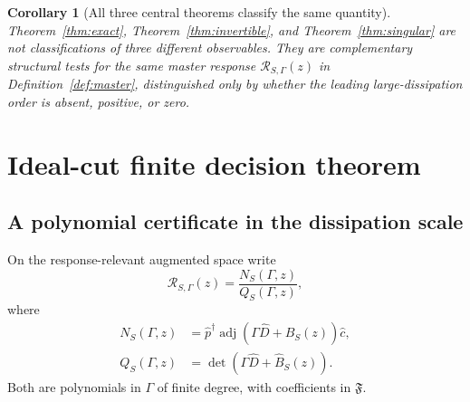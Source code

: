 \documentclass[11pt]{article}
\newtheorem{corollary}[theorem]{Corollary}
\theoremstyle{definition}
\theoremstyle{remark}
\theoremstyle{plain}
\newcommand{\R}{\mathcal R}
\newcommand{\adj}{\operatorname{adj}}
\begin{document}
\begin{corollary}[All three central theorems classify the same quantity]
Theorem~\ref{thm:exact}, Theorem~\ref{thm:invertible}, and Theorem~\ref{thm:singular} are not classifications of three different observables.  They are complementary structural tests for the same master response $\R_{S,\Gamma}(z)$ in Definition~\ref{def:master}, distinguished only by whether the leading large-dissipation order is absent, positive, or zero.
\end{corollary}

\section{Ideal-cut finite decision theorem}

\subsection{A polynomial certificate in the dissipation scale}
On the response-relevant augmented space write
\begin{equation}
 \R_{S,\Gamma}(z)
 =\frac{N_S(\Gamma,z)}{Q_S(\Gamma,z)},
\end{equation}
where
\begin{align}
 N_S(\Gamma,z)
 &=\widehat p^\dagger\adj\!\left(\Gamma\widehat D+
 \widehat B_S(z)\right)\widehat c,\label{eq:numerator}\\
 Q_S(\Gamma,z)
 &=\det\!\left(\Gamma\widehat D+
 \widehat B_S(z)\right).\label{eq:denominator}
\end{align}
Both are polynomials in $\Gamma$ of finite degree, with coefficients in $\mathfrak F$.
\end{document}
